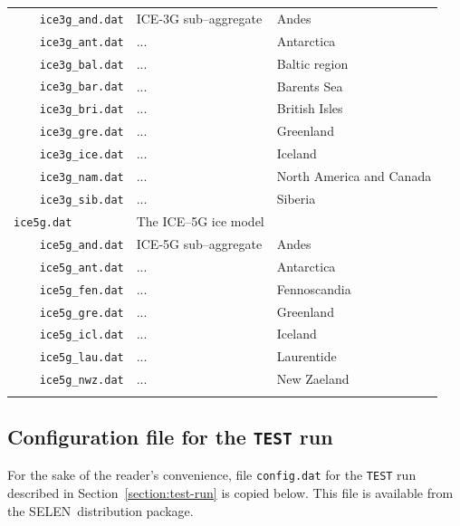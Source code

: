 \documentclass[11pt,fleqn,a4paper,titlepage]{article}
\newcommand\selen{\textsf{SELEN~}}
\begin{document}
\begin{table}[!hbp]
\begin{center}
\begin{tabular}{lll}
\texttt{~~~~ice3g\_and.dat}    & ICE-3G sub--aggregate   & Andes \\
\texttt{~~~~ice3g\_ant.dat}    & ...                    & Antarctica \\
\texttt{~~~~ice3g\_bal.dat}    & ...                    & Baltic region \\
\texttt{~~~~ice3g\_bar.dat}    & ...                    & Barents Sea  \\
\texttt{~~~~ice3g\_bri.dat}    & ...                    & British Isles  \\
\texttt{~~~~ice3g\_gre.dat}    & ...                    & Greenland\\
\texttt{~~~~ice3g\_ice.dat}    & ...                    & Iceland  \\
\texttt{~~~~ice3g\_nam.dat}    & ...                    & North America and Canada  \\
\texttt{~~~~ice3g\_sib.dat}    & ...                     & Siberia  \\
\texttt{ice5g.dat}            & The ICE--5G ice model   & \citet{Peltier_2004}\\
\texttt{~~~~ice5g\_and.dat}   & ICE-5G sub--aggregate   & Andes \\
\texttt{~~~~ice5g\_ant.dat}   & ...                     & Antarctica \\
\texttt{~~~~ice5g\_fen.dat}   & ...                     & Fennoscandia \\
\texttt{~~~~ice5g\_gre.dat}   & ...                     & Greenland \\
\texttt{~~~~ice5g\_icl.dat}   & ...                    & Iceland \\
\texttt{~~~~ice5g\_lau.dat}   & ...                    & Laurentide \\
\texttt{~~~~ice5g\_nwz.dat}   & ...                    & New Zaeland \\
\hline
\label{table:ice-models}
\end{tabular}
\end{center}
\end{table}
\clearpage


\subsection{Configuration file for the \texttt{TEST} run}\label{sec:sample-config}
For the sake of the reader's convenience, file \texttt{config.dat} for the \texttt{TEST}
run described in Section~\ref{section:test-run} is copied below. This file is 
available from the \selen distribution package. 
\end{document}
